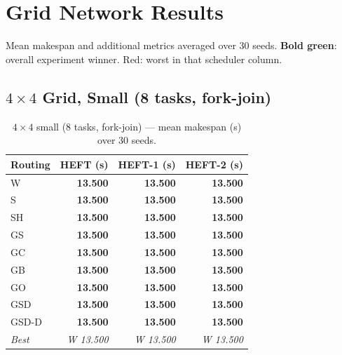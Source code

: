 \documentclass[11pt]{article}
\newcommand{\win}[1]{\textcolor{green!50!black}{\textbf{#1}}}
\newcommand{\bad}[1]{\textcolor{red!70!black}{#1}}
\begin{document}
\section{Grid Network Results}

Mean makespan and additional metrics averaged over 30 seeds.
\win{Bold green}: overall experiment winner. \bad{Red}: worst in that scheduler column.

\subsection{$4\times4$ Grid, Small (8 tasks, fork-join)}

\begin{table}[H]
\centering\small
\begin{tabular}{l r r r}
\toprule
\textbf{Routing} & \textbf{HEFT (s)} & \textbf{HEFT-1 (s)} & \textbf{HEFT-2 (s)} \\
\midrule
  W & \win{13.500} & \win{13.500} & \win{13.500} \\
  S & \win{13.500} & \win{13.500} & \win{13.500} \\
  SH & \win{13.500} & \win{13.500} & \win{13.500} \\
  GS & \win{13.500} & \win{13.500} & \win{13.500} \\
  GC & \win{13.500} & \win{13.500} & \win{13.500} \\
  GB & \win{13.500} & \win{13.500} & \win{13.500} \\
  GO & \win{13.500} & \win{13.500} & \win{13.500} \\
  GSD & \win{13.500} & \win{13.500} & \win{13.500} \\
  GSD-D & \win{13.500} & \win{13.500} & \win{13.500} \\
\midrule
  \textit{Best} & \textit{W 13.500} & \textit{W 13.500} & \textit{W 13.500} \\
\bottomrule
\end{tabular}
\caption{$4\times4$ small (8 tasks, fork-join) --- mean makespan (s) over 30 seeds.}
\end{table}
\end{document}
